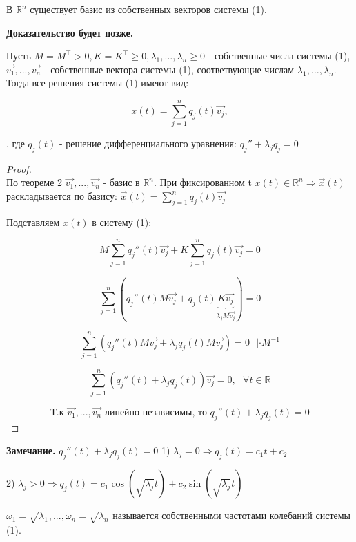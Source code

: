 \documentclass[12pt, a4paper]{report}
\begin{document}
\begin{theorem}
    В \( \mathbb{R} ^n \)  существует базис из собственных векторов системы (1).
\end{theorem}

\textbf{Доказательство будет позже.} 

\begin{theorem}
    Пусть  \( M = M^{\top} > 0 , K =K ^{\top} \geq 0 , \lambda_1, \ldots, \lambda_n \geq 0 \)  - собственные числа системы (1), \( \vec{v_1 },..., \vec{v_n}   \)  - собственные вектора системы (1), соответвующие числам \( \lambda_1, \ldots, \lambda_n \). Тогда все решения системы (1)  имеют вид: 

    \[ x(t) = \sum_{j=1} ^{n } q_j (t)\vec{v_j},   \] 

    , где \( q_j(t) \)  - решение дифференциального уравнения: \( q_j '' + \lambda_j q_j = 0 \) 
\end{theorem}

\begin{proof}
    \[  \] 
    По теореме 2 \( \vec{v_1},..., \vec{v_n }   \)  - базис в \( \mathbb{R} ^ n \). При фиксированном t \( x(t ) \in  \mathbb{R}^{n} \Rightarrow \vec{x } (t)  \)  раскладывается по базису: \( \vec{x } (t) = \sum_{j=1} ^{n } q_j (t)\vec{v_j}  \) 

    Подставляем \( x(t) \)  в систему (1): 

    \[ M \sum_{j =1}^n q_j '' (t ) \vec{v_j} + K \sum_{j =1}^n q_j (t ) \vec{v_j} = 0  \] 

    \[ \sum_{j=1}^ n \left( q_j '' (t ) M \vec{v_j } + q_j (t )\underbrace{ K \vec{v_j } }_{\lambda_j M \vec{v_j } } \right) =0\] 

    \[ \sum _{j=1}^ n \left( q_j '' (t ) M \vec{v_j } + \lambda_j q_j (t )M\vec{v_j }  \right) = 0 \text{ }  | \cdot  M^{-1}  \] 

    \[ \sum _{j=1}^ n \left( q_j '' (t  ) + \lambda_j q_j (t ) \right) \vec{v_j }= 0 , \text{ }  \forall  t \in  \mathbb{R}   \] 

    \[ \text{Т.к } \vec{v_1 },..., \vec{v_n} \text{ линейно независимы, то }  q_j '' (t ) + \lambda_j q_j (t) =0    \] 


\end{proof}

\begin{center}
    \textbf{Замечание.} \( q_j ''(t ) + \lambda_j q_j (t) = 0 \) 
    1) \( \lambda_j = 0 \Rightarrow q_j (t ) = c_1 t + c_2  \) 

    2) \( \lambda_j > 0 \Rightarrow q_j (t )  = c_1 \cos (\sqrt{\lambda_j} t) + c_2 \sin (\sqrt{\lambda_j} t) \)
\end{center}

\begin{definition}
    \( \omega_1 = \sqrt{\lambda_1},..., \omega_n = \sqrt{\lambda_n} \) называется собственными частотами колебаний системы (1).
\end{definition}


\ifdefined\mainfile
\else
    
\end{document}
